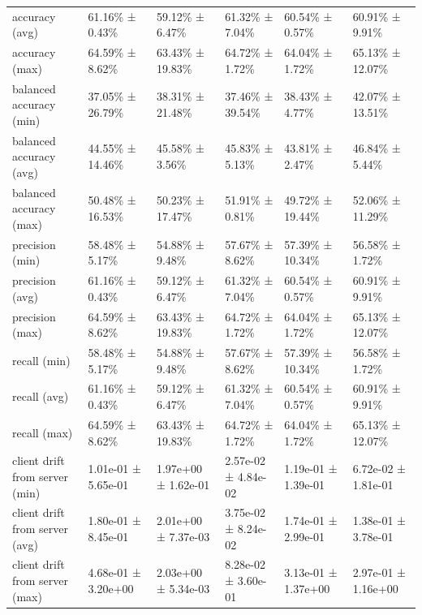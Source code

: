 \begin{tabular}{llllll}
 accuracy (avg)                     & 61.16\% ± 0.43\%      & 59.12\% ± 6.47\%      & 61.32\% ± 7.04\%      & 60.54\% ± 0.57\%      & 60.91\% ± 9.91\%      \\
 accuracy (max)                     & 64.59\% ± 8.62\%      & 63.43\% ± 19.83\%     & 64.72\% ± 1.72\%      & 64.04\% ± 1.72\%      & 65.13\% ± 12.07\%     \\
 balanced accuracy (min)            & 37.05\% ± 26.79\%     & 38.31\% ± 21.48\%     & 37.46\% ± 39.54\%     & 38.43\% ± 4.77\%      & 42.07\% ± 13.51\%     \\
 balanced accuracy (avg)            & 44.55\% ± 14.46\%     & 45.58\% ± 3.56\%      & 45.83\% ± 5.13\%      & 43.81\% ± 2.47\%      & 46.84\% ± 5.44\%      \\
 balanced accuracy (max)            & 50.48\% ± 16.53\%     & 50.23\% ± 17.47\%     & 51.91\% ± 0.81\%      & 49.72\% ± 19.44\%     & 52.06\% ± 11.29\%     \\
 precision (min)                    & 58.48\% ± 5.17\%      & 54.88\% ± 9.48\%      & 57.67\% ± 8.62\%      & 57.39\% ± 10.34\%     & 56.58\% ± 1.72\%      \\
 precision (avg)                    & 61.16\% ± 0.43\%      & 59.12\% ± 6.47\%      & 61.32\% ± 7.04\%      & 60.54\% ± 0.57\%      & 60.91\% ± 9.91\%      \\
 precision (max)                    & 64.59\% ± 8.62\%      & 63.43\% ± 19.83\%     & 64.72\% ± 1.72\%      & 64.04\% ± 1.72\%      & 65.13\% ± 12.07\%     \\
 recall (min)                       & 58.48\% ± 5.17\%      & 54.88\% ± 9.48\%      & 57.67\% ± 8.62\%      & 57.39\% ± 10.34\%     & 56.58\% ± 1.72\%      \\
 recall (avg)                       & 61.16\% ± 0.43\%      & 59.12\% ± 6.47\%      & 61.32\% ± 7.04\%      & 60.54\% ± 0.57\%      & 60.91\% ± 9.91\%      \\
 recall (max)                       & 64.59\% ± 8.62\%      & 63.43\% ± 19.83\%     & 64.72\% ± 1.72\%      & 64.04\% ± 1.72\%      & 65.13\% ± 12.07\%     \\
 client drift from server (min)     & 1.01e-01 ± 5.65e-01 & 1.97e+00 ± 1.62e-01 & 2.57e-02 ± 4.84e-02 & 1.19e-01 ± 1.39e-01 & 6.72e-02 ± 1.81e-01 \\
 client drift from server (avg)     & 1.80e-01 ± 8.45e-01 & 2.01e+00 ± 7.37e-03 & 3.75e-02 ± 8.24e-02 & 1.74e-01 ± 2.99e-01 & 1.38e-01 ± 3.78e-01 \\
 client drift from server (max)     & 4.68e-01 ± 3.20e+00 & 2.03e+00 ± 5.34e-03 & 8.28e-02 ± 3.60e-01 & 3.13e-01 ± 1.37e+00 & 2.97e-01 ± 1.16e+00 \\

\end{tabular}
